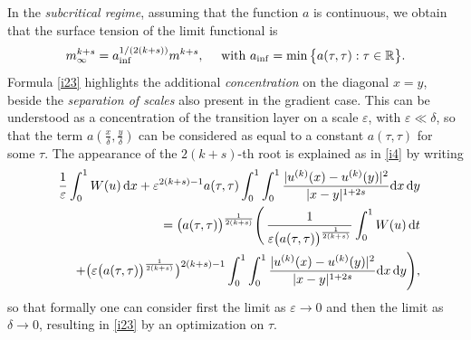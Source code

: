 \documentclass{article}
\theoremstyle{definition}
\newcommand{\de}{\mathrm{d}}
\newcommand{\e}{\varepsilon}
\def\e{\varepsilon}
\begin{document}
In the {\em subcritical regime}, assuming that the function $a$ is continuous, we obtain that the surface tension of the limit functional is
\begin{equation}\label{i23}
m^{k+s}_\infty= a_{\inf}^{1/(2(k+s))} m^{k+s}, \quad\hbox{ with } a_{\inf}= \min\big\{a(\tau,\tau):\tau\in\mathbb R\big\} .
\end{equation}
Formula \eqref{i23} highlights the additional {\em concentration} on the diagonal $x=y$, beside the {\em separation of scales} also present in the gradient case. This can be understood as a concentration of the transition layer on a scale $\e$, with $\e\ll\delta$, so that the term  $a(\frac{x}\delta,\frac{y}\delta)$ can be considered as equal to a constant $a(\tau,\tau)$ for some $\tau$. The appearance of the $2(k+s)$-th root is explained as in \eqref{i4}
by writing 
\begin{eqnarray}\label{i24}\nonumber
&&\hskip-.5cm\frac1\e\int_0^1 W(u)\,\de x+\e^{2(k+s)-1} a(\tau,\tau)\int_0^1\int_0^1\frac{|u^{(k)}(x)-u^{(k)}(y)|^2}{|x-y|^{1+2s}}\de x\,\de y\\
&&=\nonumber
\big(a(\tau,\tau)\big)^{\frac1{2(k+s)}}\Bigg(\,
\frac{1}{\e\big (a(\tau,\tau)\big)^{\frac1{2(k+s)}}}\int_0^1 W(u)\,\de t\\
&&\quad+\big(\e\big(a(\tau,\tau)\big)^{\frac1{2(k+s)}}\big)^{2(k+s)-1}\int_0^1\int_0^1\frac{|u^{(k)}(x)-u^{(k)}(y)|^2}{|x-y|^{1+2s}}\de x\,\de y\Bigg),
\end{eqnarray}
so that formally one can consider first the limit as $\e\to 0$ and then the limit as $\delta\to0$, resulting in \eqref{i23} by an optimization on $\tau$. 
\end{document}
